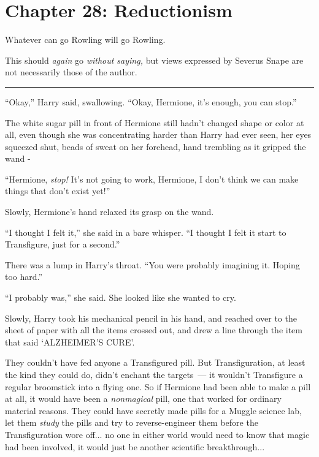 \chapter{Chapter 28: Reductionism}
Whatever can go Rowling will go Rowling.

This should \emph{again} go \emph{without saying,} but views expressed by Severus Snape are not necessarily those of the author.

\begin{center}\rule{3in}{0.4pt}\end{center}

``Okay,'' Harry said, swallowing. ``Okay, Hermione, it's enough, you can stop.''

The white sugar pill in front of Hermione still hadn't changed shape or color at all, even though she was concentrating harder than Harry had ever seen, her eyes squeezed shut, beads of sweat on her forehead, hand trembling as it gripped the wand -

``Hermione, \emph{stop!} It's not going to work, Hermione, I don't think we can make things that don't exist yet!''

Slowly, Hermione's hand relaxed its grasp on the wand.

``I thought I felt it,'' she said in a bare whisper. ``I thought I felt it start to Transfigure, just for a second.''

There was a lump in Harry's throat. ``You were probably imagining it. Hoping too hard.''

``I probably was,'' she said. She looked like she wanted to cry.

Slowly, Harry took his mechanical pencil in his hand, and reached over to the sheet of paper with all the items crossed out, and drew a line through the item that said `ALZHEIMER'S CURE'.

They couldn't have fed anyone a Transfigured pill. But Transfiguration, at least the kind they could do, didn't enchant the targets~--- it wouldn't Transfigure a regular broomstick into a flying one. So if Hermione had been able to make a pill at all, it would have been a \emph{nonmagical} pill, one that worked for ordinary material reasons. They could have secretly made pills for a Muggle science lab, let them \emph{study} the pills and try to reverse-engineer them before the Transfiguration wore off... no one in either world would need to know that magic had been involved, it would just be another scientific breakthrough...

